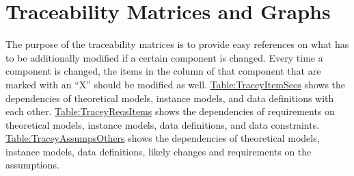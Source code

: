 \documentclass[12pt]{article}
\begin{document}
\section{Traceability Matrices and Graphs}
\label{Sec:TraceMatrices}
The purpose of the traceability matrices is to provide easy references on what has to be additionally modified if a certain component is changed. Every time a component is changed, the items in the column of that component that are marked with an ``X'' should be modified as well. \hyperref[Table:TraceyItemSecs]{Table:TraceyItemSecs} shows the dependencies of theoretical models, instance models, and data definitions with each other. \hyperref[Table:TraceyReqsItems]{Table:TraceyReqsItems} shows the dependencies of requirements on theoretical models, instance models, data definitions, and data constraints. \hyperref[Table:TraceyAssumpsOthers]{Table:TraceyAssumpsOthers} shows the dependencies of theoretical models, instance models, data definitions, likely changes and requirements on the assumptions.
\end{document}
